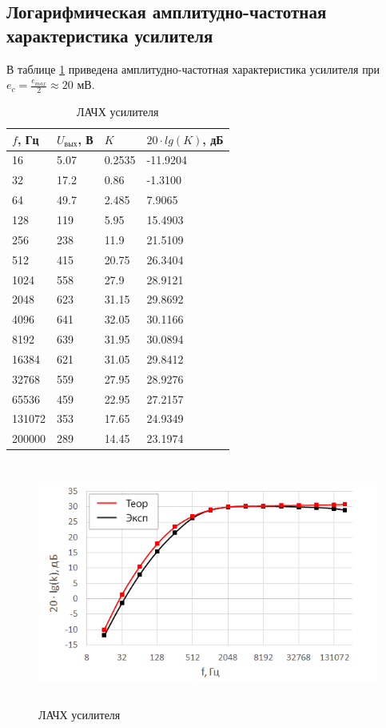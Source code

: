 \subsection{Логарифмическая амплитудно-частотная характеристика усилителя}

В таблице \ref{tabular:3} приведена амплитудно-частотная характеристика усилителя при $e_c = \frac{e_{max}}{2} \approx 20$ мВ.

\begin{table}[H]
	\begin{center}
	\caption{ЛАЧХ усилителя}
	\def\arraystretch{1.2}
		\begin{tabularx}{\textwidth}{|X|X|X|X|}
			\hline
			$f$, Гц & $U_\text{вых}$, В & $K$ & $20 \cdot lg(K)$, дБ\\\hline
			16 & 5.07 & 0.2535 & -11.9204\\\hline
			32 & 17.2 & 0.86 & -1.3100\\\hline
			64 & 49.7 & 2.485 & 7.9065\\\hline
			128 & 119 & 5.95 & 15.4903\\\hline
			256 & 238 & 11.9 & 21.5109\\\hline
			512 & 415 & 20.75 & 26.3404\\\hline
			1024 & 558 & 27.9 & 28.9121\\\hline
			2048 & 623 & 31.15 & 29.8692\\\hline
			4096 & 641 & 32.05 & 30.1166\\\hline
			8192 & 639 & 31.95 & 30.0894\\\hline
			16384 & 621 & 31.05 & 29.8412\\\hline
			32768 & 559 & 27.95 & 28.9276\\\hline
			65536 & 459 & 22.95 & 27.2157\\\hline
			131072 & 353 & 17.65 & 24.9349\\\hline
			200000 & 289 & 14.45 & 23.1974\\\hline
		\end{tabularx}
		\label{tabular:3}
	\end{center}
\end{table}

\begin{figure}[H]
	\begin{center}
		\includegraphics[height=8cm]{img/3}
		\caption{ЛАЧХ усилителя}
		\label{figure:2}
	\end{center}
\end{figure}

